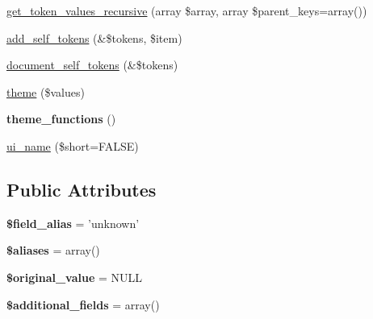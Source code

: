 \begin{DoxyCompactItemize}
\item 
\hyperlink{classviews__handler__field_a27538799840dcae28095352259eb733e}{get\_\-token\_\-values\_\-recursive} (array \$array, array \$parent\_\-keys=array())
\item 
\hyperlink{classviews__handler__field_ac61cc83a4c8c579993a254b5b1e16cbc}{add\_\-self\_\-tokens} (\&\$tokens, \$item)
\item 
\hyperlink{classviews__handler__field_ae33446d1059f13fbfb06a37da04d320e}{document\_\-self\_\-tokens} (\&\$tokens)
\item 
\hyperlink{classviews__handler__field_a31b777437d94e4904c546e3bb0d76c16}{theme} (\$values)
\item 
\hypertarget{classviews__handler__field_afd9437e7af9535ed5301dc48f619f24a}{
{\bfseries theme\_\-functions} ()}
\label{classviews__handler__field_afd9437e7af9535ed5301dc48f619f24a}

\item 
\hyperlink{classviews__handler__field_a593c70c519615b5be3b5cd43cd1b663b}{ui\_\-name} (\$short=FALSE)
\end{DoxyCompactItemize}
\subsection*{Public Attributes}
\begin{DoxyCompactItemize}
\item 
\hypertarget{classviews__handler__field_a4b54482d14d20926ed1a5b43c3cdc4d4}{
{\bfseries \$field\_\-alias} = 'unknown'}
\label{classviews__handler__field_a4b54482d14d20926ed1a5b43c3cdc4d4}

\item 
\hypertarget{classviews__handler__field_a1de93e099b1d18c873f0ad2110ff24d3}{
{\bfseries \$aliases} = array()}
\label{classviews__handler__field_a1de93e099b1d18c873f0ad2110ff24d3}

\item 
\hypertarget{classviews__handler__field_ad4e239cd34fa8d2ad7a57b29e9fd0043}{
{\bfseries \$original\_\-value} = NULL}
\label{classviews__handler__field_ad4e239cd34fa8d2ad7a57b29e9fd0043}

\item 
\hypertarget{classviews__handler__field_a7e071808c1a94709437b1da72c419730}{
{\bfseries \$additional\_\-fields} = array()}
\label{classviews__handler__field_a7e071808c1a94709437b1da72c419730}

\end{DoxyCompactItemize}


